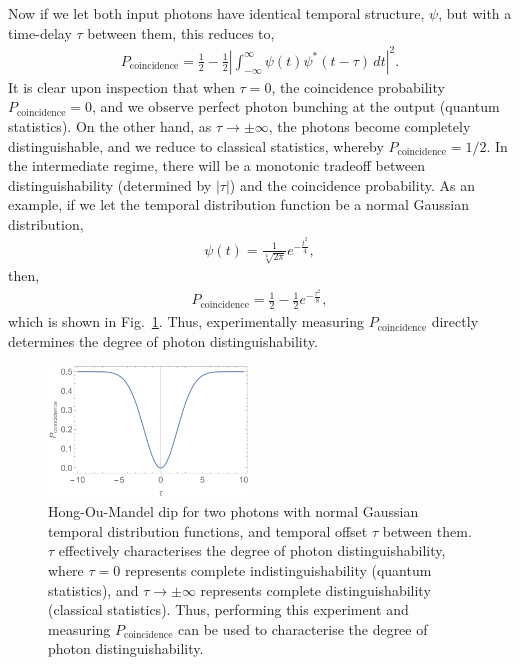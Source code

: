 Now if we let both input photons have identical temporal structure, $\psi$, but with a time-delay $\tau$ between them, this reduces to,
\begin{align}
P_\mathrm{coincidence} = \frac{1}{2} - \frac{1}{2} \left| \int^\infty_{-\infty} \psi(t)\psi^*(t-\tau)\,dt\right|^2.
\end{align}
It is clear upon inspection that when \mbox{$\tau=0$}, the coincidence probability \mbox{$P_\mathrm{coincidence}=0$}, and we observe perfect photon bunching at the output (quantum statistics). On the other hand, as \mbox{$\tau\to\pm\infty$}, the photons become completely distinguishable, and we reduce to classical statistics, whereby \mbox{$P_\mathrm{coincidence}=1/2$}. In the intermediate regime, there will be a monotonic tradeoff between distinguishability (determined by $|\tau|$) and the coincidence probability. As an example, if we let the temporal distribution function be a normal Gaussian distribution,
\begin{align}
\psi(t) = \frac{1}{\sqrt[4]{2\pi}}e^{-\frac{t^2}{4}},
\end{align}
then,
\begin{align}
P_\mathrm{coincidence} = \frac{1}{2} - \frac{1}{2} e^{-\frac{\tau^2}{8}},
\end{align}
which is shown in Fig.~\ref{fig:HOM_dip}. Thus, experimentally measuring $P_\mathrm{coincidence}$ directly determines the degree of photon distinguishability.

\begin{figure}[!htbp]
\includegraphics[clip=true, width=0.475\textwidth]{HOM_dip}
\captionspacefig \caption{Hong-Ou-Mandel dip for two photons with normal Gaussian temporal distribution functions, and temporal offset $\tau$ between them. $\tau$ effectively characterises the degree of photon distinguishability, where \mbox{$\tau=0$} represents complete indistinguishability (quantum statistics), and \mbox{$\tau\to\pm\infty$} represents complete distinguishability (classical statistics). Thus, performing this experiment and measuring $P_\mathrm{coincidence}$ can be used to characterise the degree of photon distinguishability.} \label{fig:HOM_dip}
\end{figure}

